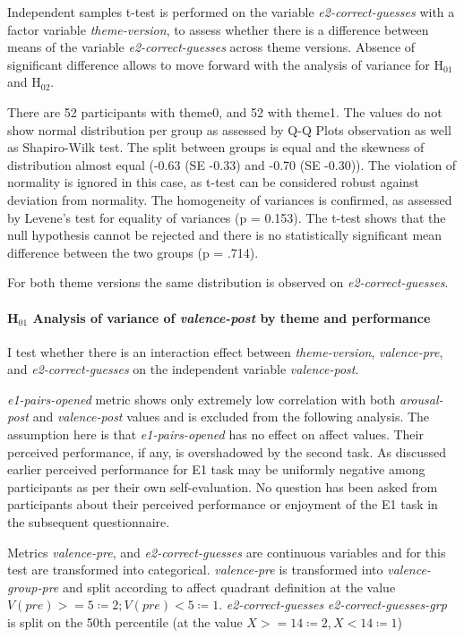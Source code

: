 	Independent samples t-test is performed on the variable \textit{e2-correct-guesses} with a factor variable \textit{theme-version}, to assess whether there is a difference between means of the variable \textit{e2-correct-guesses} across theme versions. Absence of significant difference allows to move forward with the analysis of variance for H$_{01}$ and H$_{02}$.
	
	There are 52 participants with theme0, and 52 with theme1. The values do not show normal distribution per group as assessed by Q-Q Plots observation as well as Shapiro-Wilk test. The split between groups is equal and the skewness of distribution almost equal (-0.63 (SE -0.33) and -0.70 (SE -0.30)). The violation of normality is ignored in this case, as t-test can be considered robust against deviation from normality. The homogeneity of variances is confirmed, as assessed by Levene's test for equality of variances (p = 0.153). The t-test shows that the null hypothesis cannot be rejected and there is no statistically significant mean difference between the two groups (p = .714).
	
	For both theme versions the same distribution is observed on \textit{e2-correct-guesses}.
	
	
	\paragraph{H$_{01}$ Analysis of variance of \textit{valence-post} by theme and performance}
	
	I test whether there is an interaction effect between \textit{theme-version}, \textit{valence-pre}, and \textit{e2-correct-guesses} on the independent variable \textit{valence-post}.
	
	\textit{e1-pairs-opened} metric shows only extremely low correlation with both \textit{arousal-post} and \textit{valence-post} values and is excluded from the following analysis. The assumption here is that \textit{e1-pairs-opened} has no effect on affect values. Their perceived performance, if any, is overshadowed by the second task. As discussed earlier perceived performance for E1 task may be uniformly negative among participants as per their own self-evaluation. No question has been asked from participants about their perceived performance or enjoyment of the E1 task in the subsequent questionnaire.
	
	Metrics \textit{valence-pre}, and \textit{e2-correct-guesses} are continuous variables and for this test are transformed into categorical.
	\textit{valence-pre} is transformed into \textit{valence-group-pre} and split according to affect quadrant definition at the value \( V(pre) >= 5 \coloneqq 2; V(pre) < 5 \coloneqq 1\). \textit{e2-correct-guesses} \textit{e2-correct-guesses-grp} is split on the 50th percentile (at the value \(X >= 14 \coloneqq 2, X < 14 \coloneqq 1\))
	
